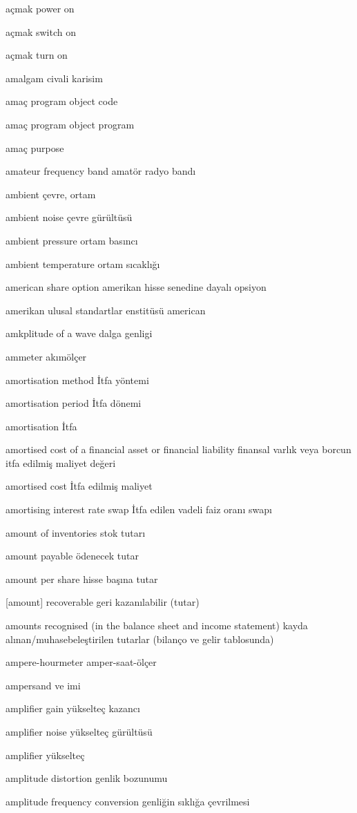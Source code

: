 \documentclass[12pt,fleqn]{article}\usepackage{../../common}
\begin{document}
açmak power on

açmak switch on

açmak turn on

amalgam civali karisim

amaç program object code

amaç program object program

amaç purpose

amateur frequency band amatör radyo bandı

ambient çevre, ortam

ambient noise çevre gürültüsü

ambient pressure ortam basıncı

ambient temperature ortam sıcaklığı

american share option amerikan hisse senedine dayalı opsiyon

amerikan ulusal standartlar enstitüsü american

amkplitude of a wave dalga genligi

ammeter akımölçer

amortisation method İtfa yöntemi

amortisation period İtfa dönemi

amortisation İtfa

amortised cost of a financial asset or financial liability finansal varlık veya borcun itfa edilmiş maliyet değeri

amortised cost İtfa edilmiş maliyet

amortising interest rate swap İtfa edilen vadeli faiz oranı swapı

amount of inventories stok tutarı

amount payable ödenecek tutar

amount per share hisse başına tutar

[amount] recoverable geri kazanılabilir (tutar)

amounts recognised (in the balance sheet and income statement) kayda alınan/muhasebeleştirilen tutarlar (bilanço ve gelir tablosunda)

ampere-hourmeter amper-saat-ölçer

ampersand ve imi

amplifier gain yükselteç kazancı

amplifier noise yükselteç gürültüsü

amplifier yükselteç

amplitude distortion genlik bozunumu

amplitude frequency conversion genliğin sıklığa çevrilmesi
\end{document}
